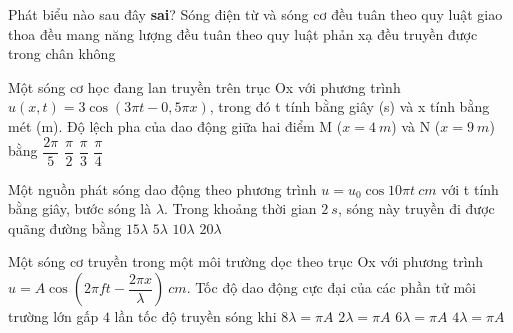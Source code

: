 	\begin{ex} %
		Phát biểu nào sau đây \textbf{sai}? Sóng điện từ và sóng cơ
		\choice
		{đều tuân theo quy luật giao thoa}
		{đều mang năng lượng}
		{đều tuân theo quy luật phản xạ}
		{\True đều truyền được trong chân không}
	\end{ex}
	\begin{ex}%
		Một sóng cơ học đang lan truyền trên trục Ox với phương trình $u(x, t)=3\cos(3\pi t - 0,5\pi x)$, trong đó t tính bằng giây (s) và x tính bằng mét (m). Độ lệch pha của dao động giữa hai điểm M ($x=4\ m$) và N ($x=9\ m$) bằng
		\choice
		{$\dfrac{2\pi}{5}$}
		{\True $\dfrac{\pi}{2}$}
		{$\dfrac{\pi}{3}$}
		{$\dfrac{\pi}{4}$}
	\end{ex}
	\begin{ex}%
		Một nguồn phát sóng dao động theo phương trình $u=u_0\cos10\pi t\ cm$ với t tính bằng giây, bước sóng là $\lambda$. Trong khoảng thời gian $2\ s$, sóng này truyền đi được quãng đường bằng
		\choice
		{$15\lambda$}
		{$5\lambda$}
		{\True $10\lambda$}
		{$20\lambda$}
	\end{ex}
	\begin{ex}%
		Một sóng cơ truyền trong một môi trường dọc theo trục Ox với phương trình $u=A\cos \left( 2\pi ft-\dfrac{2\pi x}{\lambda } \right)\ cm$. Tốc độ dao động cực đại của các phần tử môi trường lớn gấp $4$ lần tốc độ truyền sóng khi
		\choice
		{$8\lambda = \pi A$}
		{\True $2\lambda = \pi A$}
		{$6\lambda = \pi A$}
		{$4\lambda = \pi A$}
	\end{ex}
